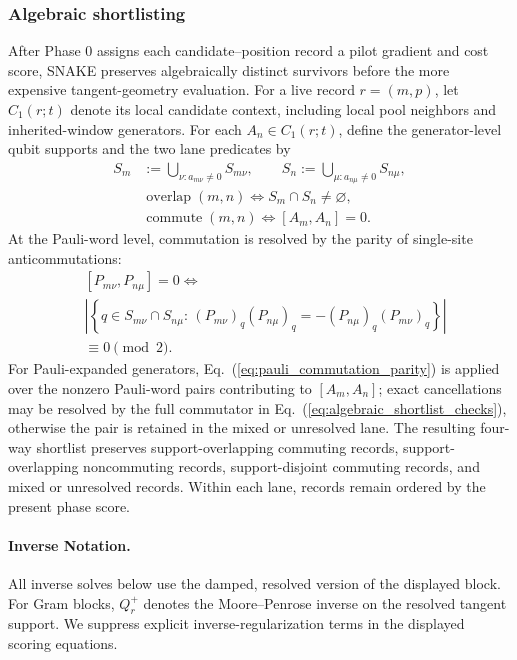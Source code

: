 \documentclass[
  reprint,
  amsmath,
  amssymb,
  aps,
  pra,
  nofootinbib,
  superscriptaddress,
  floatfix
]{revtex4-2}
\begin{document}
\subsubsection{Algebraic shortlisting}

After Phase 0 assigns each candidate--position record a pilot gradient and cost score, SNAKE preserves algebraically distinct survivors before the more expensive tangent-geometry evaluation. For a live record $r=(m,p)$, let $C_1(r;t)$ denote its local candidate context, including local pool neighbors and inherited-window generators. For each $A_n\in C_1(r;t)$, define the generator-level qubit supports and the two lane predicates by
\begin{equation}
\begin{aligned}
S_m&:=\bigcup_{\nu:a_{m\nu}\ne0}S_{m\nu},
\qquad
S_n:=\bigcup_{\mu:a_{n\mu}\ne0}S_{n\mu},\\
&\operatorname{overlap}(m,n)
\Longleftrightarrow
S_m\cap S_n\ne\varnothing, \\
&\operatorname{commute}(m,n)
\Longleftrightarrow
[A_m,A_n]=0 .
\end{aligned}
\label{eq:algebraic_shortlist_checks}
\end{equation}
At the Pauli-word level, commutation is resolved by the parity of single-site anticommutations:
\begin{equation}
\begin{aligned}
&[P_{m\nu},P_{n\mu}]=0 \Longleftrightarrow \\
&\left|
\left\{
q\in S_{m\nu}\cap S_{n\mu}
:\,
(P_{m\nu})_q(P_{n\mu})_q
=-(P_{n\mu})_q(P_{m\nu})_q
\right\}
\right|\\& \equiv0\pmod 2 .
\end{aligned}
\label{eq:pauli_commutation_parity}
\end{equation}
For Pauli-expanded generators, Eq.~(\ref{eq:pauli_commutation_parity}) is applied over the nonzero Pauli-word pairs contributing to $[A_m,A_n]$; exact cancellations may be resolved by the full commutator in Eq.~(\ref{eq:algebraic_shortlist_checks}), otherwise the pair is retained in the mixed or unresolved lane. The resulting four-way shortlist preserves support-overlapping commuting records, support-overlapping noncommuting records, support-disjoint commuting records, and mixed or unresolved records. Within each lane, records remain ordered by the present phase score.

\paragraph*{Inverse Notation.}
All inverse solves below use the damped, resolved version of the displayed block. For Gram blocks, \(Q_r^+\) denotes the Moore--Penrose inverse on the resolved tangent support. We suppress explicit inverse-regularization terms in the displayed scoring equations.
\end{document}
